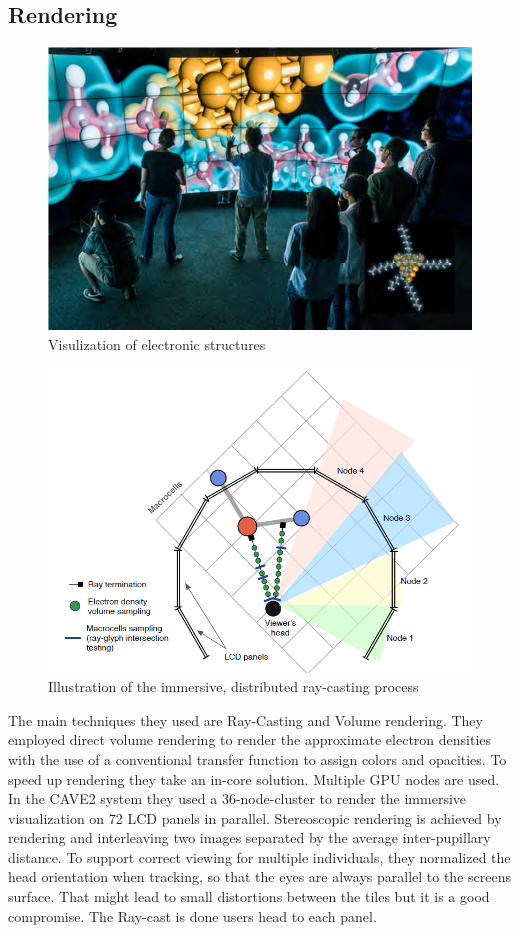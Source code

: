 \documentclass[10pt,twocolumn,letterpaper]{article}
\begin{document}
\subsection{Rendering}
\begin{figure}
	\includegraphics{atomistic_4.png}
	\caption{Visulization of electronic structures}
	\label{img:atomistic1}
\end{figure}
\begin{figure}
	\includegraphics{atomistic_6.png}
	\caption{Illustration of the immersive, distributed ray-casting process}
	\label{img:atomistic2}
\end{figure}
The main techniques they used are Ray-Casting and Volume rendering.
 They employed  direct volume rendering to render the approximate electron densities with the use of a conventional transfer function to assign colors and opacities. To speed up rendering they take an in-core solution. Multiple GPU nodes are used. In the CAVE2 system they used a 36-node-cluster to render the immersive visualization on 72 LCD panels in parallel. Stereoscopic rendering is achieved by rendering and interleaving two images separated by the average inter-pupillary distance. To support correct viewing for multiple individuals, they normalized the head orientation when tracking, so that the eyes are always parallel to the screens surface. That might lead to small distortions between the tiles but it is a good compromise. The Ray-cast is done users head to each panel.
\end{document}
